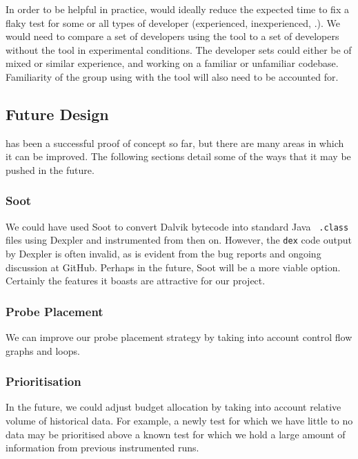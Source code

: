 In order to be helpful in practice, \venera would ideally reduce the expected
time to fix a flaky test for some or all types of developer (experienced,
inexperienced, \etc.). We would need to compare a set of developers using the
tool to a set of developers without the tool in experimental conditions. The
developer sets could either be of mixed or similar experience, and working on a
familiar or unfamiliar codebase. Familiarity of the group using \venera with
the tool will also need to be accounted for.


\subsection{Future Design}

\venera has been a successful proof of concept so far, but there are many areas
in which it can be improved. The following sections detail some of the ways that
it may be pushed in the future.

\subsubsection{Soot}

We could have used Soot to convert Dalvik bytecode into standard Java {\tt
.class} files using Dexpler \cite{bartel:soap2012} and instrumented from then
on. However, the {\tt dex} code output by Dexpler is often invalid, as is
evident from the bug reports and ongoing discussion at GitHub. Perhaps in the
future, Soot will be a more viable option. Certainly the features it boasts are
attractive for our project.

\subsubsection{Probe Placement}

We can improve our probe placement strategy by taking into account control flow
graphs and loops.

\subsubsection{Prioritisation}

In the future, we could adjust \flaky budget allocation by taking into account
relative volume of historical data. For example, a newly \flaky test for which
we have little to no data may be prioritised above a known \flaky test for which
we hold a large amount of information from previous instrumented runs.

